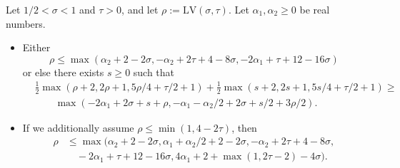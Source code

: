 \documentclass[a4paper, 10pt]{amsart}
\newcommand{\LV}{\mathrm{LV}}
\begin{document}
\begin{theorem}\label{bourgain-lvt}\cite{bourgain_large_2000} Let $1/2 < \sigma < 1$ and $\tau > 0$, and let $\rho := \LV(\sigma,\tau)$.  Let $\alpha_1, \alpha_2 \geq 0$ be real numbers.
    \begin{itemize}
        \item[(i)]  Either
    \begin{equation}\label{rho1}
     \rho \leq \max( \alpha_2 + 2 - 2 \sigma, -\alpha_2 + 2\tau+4-8\sigma, -2\alpha_1 + \tau + 12 - 16 \sigma)
    \end{equation}
    or else there exists $s \geq 0$ such that
    \begin{equation}\label{rs}
    \begin{split}
         &\frac{1}{2}\max(\rho+2, 2\rho+1, 5\rho/4 + \tau/2 + 1) + \frac{1}{2}\max(s+2, 2s+1, 5s/4 + \tau/2 + 1) \geq \\
            &\qquad\max( -2\alpha_1 + 2\sigma + s + \rho, -\alpha_1 - \alpha_2/2 + 2\sigma + s/2 + 3\rho/2).
    \end{split}
    \end{equation}
        \item[(ii)] \cite[Lemma 4.60]{bourgain_large_2000} If we additionally assume $\rho \leq \min(1, 4-2\tau)$, then
        \begin{align*}
            \rho &\leq \max( \alpha_2 + 2 - 2 \sigma, \alpha_1+\alpha_2/2 + 2-2\sigma, -\alpha_2 + 2\tau+4-8\sigma, \\
            &\quad -2\alpha_1 + \tau + 12 - 16 \sigma, 4\alpha_1 + 2+\max(1,2\tau-2)-4\sigma).
        \end{align*}
\end{itemize}
    \end{theorem}
\end{document}
